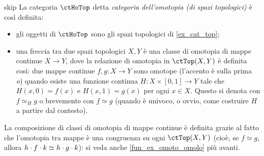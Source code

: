 \begin{hExample}{skip}\label{ex_cat_hotop}
 La categoria \(\ctHoTop\) detta \emph{categoria dell'omotopia (di spazi topologici)} è così definita:
 \begin{itemize}
  \item gli oggetti di \(\ctHoTop\) sono gli spazi topologici di \ref{ex_cat_top};
  \item una freccia tra due spazi topologici \(X,Y\) è una classe di omotopia di mappe continue \(X\to Y\), dove la relazione di omotopia in \(\ctTop(X,Y)\) è definita così: due mappe continue \(f,g \colon X\to Y\) sono omotope (l'accento è sulla prima \emph{o}) quando esiste una funzione continua \(H \colon X \times [0,1] \to Y\) tale che \(H(x,0) = f(x)\) e \(H(x,1)=g(x)\) per ogni \(x\in X\). Questo si denota con \(f\simeq_H g\) o brevemente con \(f\simeq g\) (quando è univoco, o ovvio, come costruire \(H\) a partire dal contesto).
 \end{itemize}
 La composizione di classi di omotopia di mappe continue è definita grazie al fatto che l'omotopia tra mappe è una congruenza su ogni \(\ctTop(X,Y)\) (cioè, se \(f\simeq g\), allora \(h\cdot f\cdot k\simeq h\cdot g\cdot k\)): si veda anche \ref{fun_ex_omoto_omolo} più avanti.
\end{hExample}
